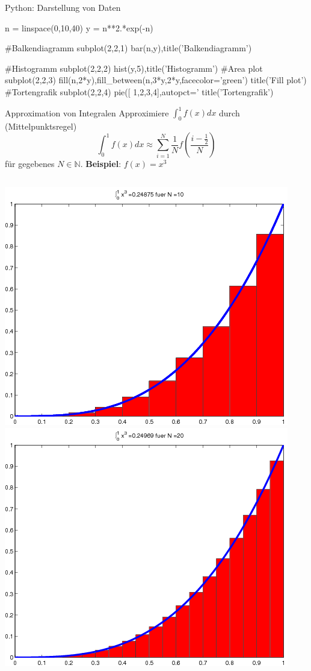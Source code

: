 \documentclass[hyperref={xetex}]{beamer}
\begin{document}
% 
% 
\begin{frame}[fragile]{Python: Darstellung von Daten}
\begin{pyin}
n = linspace(0,10,40)
y = n**2.*exp(-n)

#Balkendiagramm
subplot(2,2,1)
bar(n,y),title('Balkendiagramm')

#Histogramm
subplot(2,2,2)
hist(y,5),title('Histogramm')
#Area plot
subplot(2,2,3)
fill(n,2*y),fill_between(n,3*y,2*y,facecolor='green')
title('Fill plot')
#Tortengrafik
subplot(2,2,4)
pie([ 1,2,3,4],autopct='%
title('Tortengrafik')
\end{pyin}
\end{frame}
% 
% 
\begin{frame}[fragile]{Approximation von Integralen}
Approximiere $\int_0^1 f(x) dx$ durch (Mittelpunktsregel)
{\scriptsize \[ \int_0^1 f(x) dx \approx  \sum_{i=1}^{N} \frac{1}{N} f \left(
\frac{i-\frac{1}{2}}{N} \right ) \]}
für gegebenes $N \in \mathbb{N}$. \textbf{Beispiel}: $f(x)=x^3$
\begin{columns}[t]
\includegraphics[width=\textwidth]{figures/integral_N=10} 
\includegraphics[width=\textwidth]{figures/integral_N=20}

\end{columns}
\end{frame}
\end{document}
